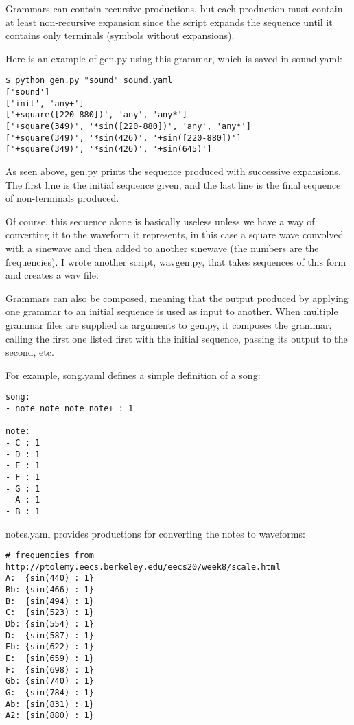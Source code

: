 \documentclass[11pt]{article}
\begin{document}
Grammars can contain recursive productions, but each production must contain
at least non-recursive expansion since the script expands the sequence until
it contains only terminals (symbols without expansions).

Here is an example of gen.py using this grammar, which is saved in sound.yaml:
\begin{verbatim}
$ python gen.py "sound" sound.yaml
['sound']
['init', 'any+']
['+square([220-880])', 'any', 'any*']
['+square(349)', '*sin([220-880])', 'any', 'any*']
['+square(349)', '*sin(426)', '+sin([220-880])']
['+square(349)', '*sin(426)', '+sin(645)']
\end{verbatim}

As seen above, gen.py prints the sequence produced with successive expansions.
The first line is the initial sequence given, and the last line is the final
sequence of non-terminals produced.

Of course, this sequence alone is basically useless unless we have a way of
converting it to the waveform it represents, in this case a square wave
convolved with a sinewave and then added to another sinewave (the numbers are
the frequencies).  I wrote another script, wavgen.py, that takes sequences of
this form and creates a wav file.

Grammars can also be composed, meaning that the output produced by applying
one grammar to an initial sequence is used as input to another.  When multiple
grammar files are supplied as arguments to gen.py, it composes the grammar,
calling the first one listed first with the initial sequence, passing its
output to the second, etc.

For example, song.yaml defines a simple definition of a song:
\begin{verbatim}
song:
- note note note note+ : 1

note:
- C : 1
- D : 1
- E : 1
- F : 1
- G : 1
- A : 1
- B : 1
\end{verbatim}

notes.yaml provides productions for converting the notes to waveforms:
\begin{verbatim}
# frequencies from http://ptolemy.eecs.berkeley.edu/eecs20/week8/scale.html
A:  {sin(440) : 1}
Bb: {sin(466) : 1}
B:  {sin(494) : 1}
C:  {sin(523) : 1}
Db: {sin(554) : 1}
D:  {sin(587) : 1}
Eb: {sin(622) : 1}
E:  {sin(659) : 1}
F:  {sin(698) : 1}
Gb: {sin(740) : 1}
G:  {sin(784) : 1}
Ab: {sin(831) : 1}
A2: {sin(880) : 1}
\end{verbatim}
\end{document}
